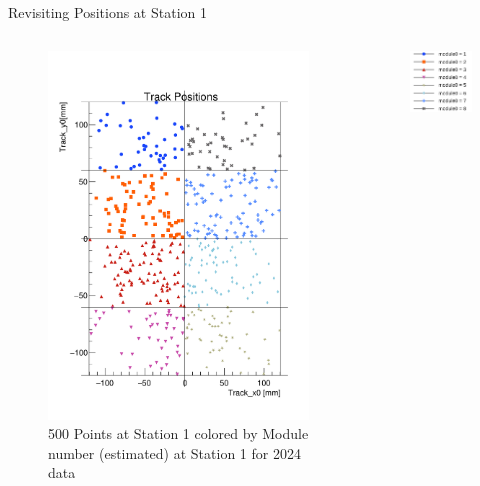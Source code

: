 \begin{frame}{Revisiting Positions at Station 1}
    \begin{columns}
        \begin{column}{1.2\linewidth}
            \begin{figure}
                \centering
                \includegraphics[height=0.8\textheight]{./ModuleLevelPlots/Positions_st0_module0.pdf}
                \caption{500 Points at Station 1 colored by Module number (estimated) at Station 1 for 2024 data}
            \end{figure}
        \end{column}
        \begin{column}{0.2\linewidth}
            \begin{figure}
                \hspace{-7cm}\includegraphics[scale=0.25]{./assets/image.png}

\end{figure}
\end{column}
\end{columns}
\end{frame}
